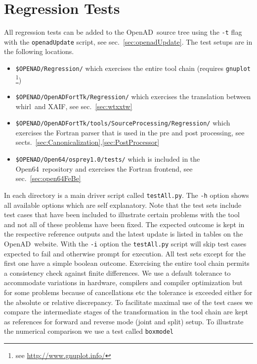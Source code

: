 \documentclass{book}
\newcommand{\OpenAD}{OpenAD}
\newcommand{\OpenSixtyFour}{Open64}
\newcommand{\xaif}{XAIF}
\newcommand{\whirl}{whirl}
\newcommand{\refsec}[1]{{sec.~\ref{#1}}}
\newcommand{\refsecs}[2]{{sects.~\ref{#1},\ref{#2}}}
\begin{document}
\section{Regression Tests}\label{sec:regression}
All regression tests can be added to the \OpenAD\ source tree using the \lstinline{-t} 
flag with the \lstinline{openadUpdate} script, see \refsec{sec:openadUpdate}.
The  test setups are in the following locations. 
\begin{itemize}
\item\lstinline{$OPENAD/Regression/}%
which exercises the entire tool chain (requires \lstinline{gnuplot} \footnote{
see \url{http://www.gnuplot.info/}})
\item\lstinline{$OPENAD/OpenADFortTk/Regression/}%
which exercises the translation between \whirl\ and \xaif, see \refsec{sec:wtxxtw} 
\item\lstinline{$OPENAD/OpenADFortTk/tools/SourceProcessing/Regression/}%
which exercises the Fortran parser that is used in the pre and post processing, see \refsecs{sec:Canonicalization}{sec:PostProcessor} 
\item\lstinline{$OPENAD/Open64/osprey1.0/tests/}%
which is included in the \OpenSixtyFour\ repository and exercises the Fortran frontend, see \refsec{sec:open64FeBe}
\end{itemize}
In each directory is a main driver script called \lstinline{testAll.py}. 
The \lstinline{-h} option shows all available options which are self 
explanatory.  Note that the test sets include test cases that have been included 
to illustrate certain problems with the tool and not all of these problems have 
been fixed. The expected outcome is kept in the respective reference outputs 
and the latest update is listed in tables on the \OpenAD\ website. 
With the \lstinline{-i} option the \lstinline{testAll.py} script will skip test cases  
expected to fail and otherwise prompt for execution. 
All test sets except for the first one have a simple boolean outcome. 
Exercising the entire tool chain permits a consistency check against finite differences. 
We use a default tolerance to accommodate variations in hardware, compilers and 
compiler optimization but for 
some problems because of cancellations etc the tolerance is exceeded either for the 
absolute or relative discrepancy. 
To facilitate maximal use of the test cases we  compare the  intermediate stages of the 
transformation in the tool chain are kept as references for forward and reverse mode (joint and 
split) setup. To illustrate the numerical comparison we use a test called \lstinline{boxmodel}
\end{document}
